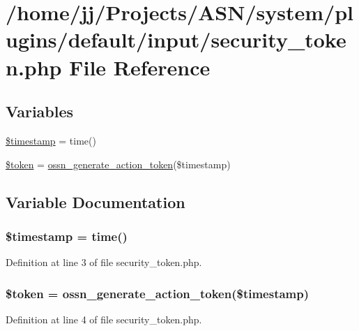 \hypertarget{security__token_8php}{}\section{/home/jj/\+Projects/\+A\+S\+N/system/plugins/default/input/security\+\_\+token.php File Reference}
\label{security__token_8php}
\subsection*{Variables}
\begin{DoxyCompactItemize}
\item 
\hyperlink{security__token_8php_a2b69de9676dd97c675cd4d9bcceb684c}{\$timestamp} = time()
\item 
\hyperlink{security__token_8php_a00ae4fcafb1145f5e968bdf920f83e2e}{\$token} = \hyperlink{ossn_8lib_8securitytoken_8php_a2a442e28fe67811329ef1319ebb035d0}{ossn\+\_\+generate\+\_\+action\+\_\+token}(\$timestamp)
\end{DoxyCompactItemize}


\subsection{Variable Documentation}
\subsubsection[{\texorpdfstring{\$timestamp}{$timestamp}}]{\setlength{\rightskip}{0pt plus 5cm}\$timestamp = time()}\hypertarget{security__token_8php_a2b69de9676dd97c675cd4d9bcceb684c}{}\label{security__token_8php_a2b69de9676dd97c675cd4d9bcceb684c}


Definition at line 3 of file security\+\_\+token.\+php.

\subsubsection[{\texorpdfstring{\$token}{$token}}]{\setlength{\rightskip}{0pt plus 5cm}\$token = {\bf ossn\+\_\+generate\+\_\+action\+\_\+token}(\$timestamp)}\hypertarget{security__token_8php_a00ae4fcafb1145f5e968bdf920f83e2e}{}\label{security__token_8php_a00ae4fcafb1145f5e968bdf920f83e2e}


Definition at line 4 of file security\+\_\+token.\+php.

